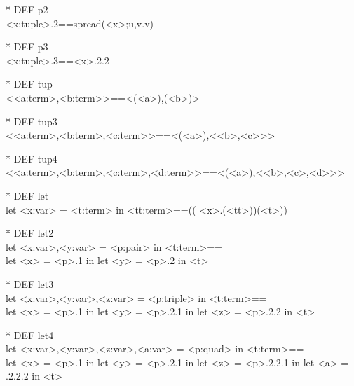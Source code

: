 \begin{prl*}
\>* DEF p2\\
\>  <x:tuple>.2==spread(<x>;u,v.v)
\end{prl*}

\begin{prl*}
\>* DEF p3\\
\>  <x:tuple>.3==<x>.2.2
\end{prl*}

\begin{prl*}
\>* DEF tup\\
\>  \mbackslash{}<<a:term>,<b:term>\mbackslash{}>==<(<a>),(<b>)>
\end{prl*}

\begin{prl*}
\>* DEF tup3\\
\>  \mbackslash{}<<a:term>,<b:term>,<c:term>\mbackslash{}>==<(<a>),<<b>,<c>>>
\end{prl*}

\begin{prl*}
\>* DEF tup4\\
\>  \mbackslash{}<<a:term>,<b:term>,<c:term>,<d:term>\mbackslash{}>==<(<a>),<<b>,<c>,<d>>>
\end{prl*}

\begin{prl*}
\>* DEF let\\
\>  let <x:var> = <t:term> in <tt:term>==((\mbackslash{} <x>.(<tt>))(<t>))
\end{prl*}

\begin{prl*}
\>* DEF let2\\
\>  let <x:var>,<y:var> = <p:pair> in <t:term>==\\
\>  let <x> = <p>.1 in let <y> = <p>.2 in <t>
\end{prl*}

\begin{prl*}
\>* DEF let3\\
\>  let <x:var>,<y:var>,<z:var> = <p:triple> in <t:term>==\\
\>  let <x> = <p>.1 in let <y> = <p>.2.1 in let <z> = <p>.2.2 in <t>
\end{prl*}

\begin{prl*}
\>* DEF let4\\
\>  let <x:var>,<y:var>,<z:var>,<a:var> = <p:quad> in <t:term>==\\
\>  let <x> = <p>.1 in let <y> = <p>.2.1 in let <z> = <p>.2.2.1 in let <a> = .2.2.2 in <t>
\end{prl*}

